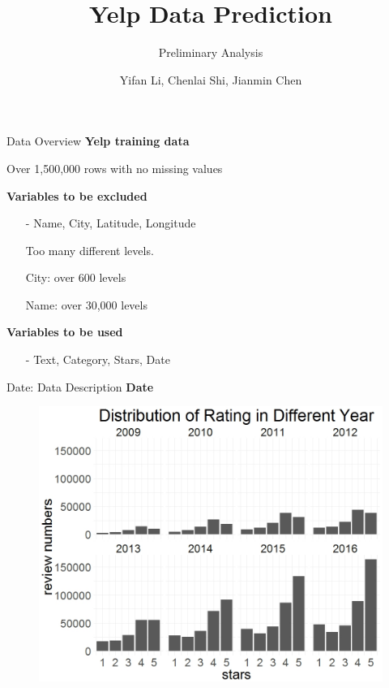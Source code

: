 \documentclass[10pt]{beamer}
\title{Yelp Data Prediction}
\subtitle{Preliminary Analysis}
\date{}
\author{Yifan Li, Chenlai Shi, Jianmin Chen}
\institute{Monday Group 1}
\begin{document}
\maketitle

\begin{frame}{Data Overview}
\textbf{Yelp training data} 

Over 1,500,000 rows with no missing values

\textbf{Variables to be excluded}
\begin{itemize}
    \item[-] Name, City, Latitude, Longitude
    
    Too many different levels.
    
    City: over 600 levels
    
    Name: over 30,000 levels
\end{itemize}

\textbf{Variables to be used}
\begin{itemize}
    \item[-] Text, Category, Stars, Date
\end{itemize}
\end{frame}

\begin{frame}{Date: Data Description}
\textbf{Date}
\begin{figure}
    \centering
    \includegraphics[scale=0.3]{../image/date.jpeg}
\end{figure}    
\end{frame}
\end{document}
